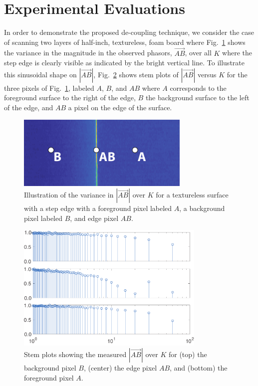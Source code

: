 \documentclass[10pt]{article}
\begin{document}
\section{Experimental Evaluations}
\noindent In order to demonstrate the proposed de-coupling technique, we consider the case of scanning two layers of half-inch, textureless, foam board where Fig.~\ref{fig02} shows the variance in the magnitude in the observed phasors, $\vec{AB}$, over all $K$ where the step edge is clearly visible as indicated by the bright vertical line.  To illustrate this sinusoidal shape on $|\vec{AB}|$, Fig.~\ref{fig03} shows stem plots of $|\vec{AB}|$ versus $K$ for the three pixels of Fig.~\ref{fig02}, labeled $A$, $B$, and $AB$ where $A$ corresponds to the foreground surface to the right of the edge, $B$ the background surface to the left of the edge, and $AB$ a pixel on the edge of the surface.  

\begin{figure}[!t]
\centering\includegraphics[width=3.25in]{Figures/figure02}
\caption{Illustration of the variance in $|\vec{AB}|$ over $K$ for a textureless surface with a step edge with a foreground pixel labeled $A$, a background pixel labeled $B$, and edge pixel $AB$.}
\label{fig02}
\end{figure}

\begin{figure}[!t]
\centering\includegraphics[width=3.55in]{Figures/figure03}
\caption{Stem plots showing the measured $|\vec{AB}|$ over $K$ for (top) the background pixel $B$, (center) the edge pixel $AB$, and (bottom) the foreground pixel $A$.}
\label{fig03}
\end{figure}
\end{document}
